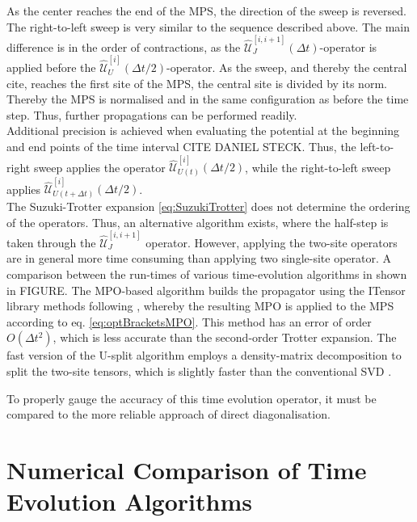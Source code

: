 As the center reaches the end of the MPS, the direction of the sweep is reversed. The right-to-left sweep is very similar to the sequence described above. The main difference is in the order of contractions, as the $\hat{\mathcal{U}}_{J}^{[i,i+1]} (\Delta t)$-operator is applied before the $\hat{\mathcal{U}}_{U}^{[i]} (\Delta t /2)$-operator. As the sweep, and thereby the central cite, reaches the first site of the MPS, the central site is divided by its norm. Thereby the MPS is normalised and in the same configuration as before the time step. Thus, further propagations can be performed readily.\\ 
Additional precision is achieved when evaluating the potential at the beginning and end points of the time interval CITE DANIEL STECK. Thus, the left-to-right sweep applies the operator $\hat{\mathcal{U}}_{U(t)}^{[i]} (\Delta t /2)$, while the right-to-left sweep applies $\hat{\mathcal{U}}_{U(t + \Delta t)}^{[i]} (\Delta t /2)$.\\

The Suzuki-Trotter expansion \eqref{eq:SuzukiTrotter} does not determine the ordering of the operators. Thus, an alternative algorithm exists, where the half-step is taken through the $\hat{\mathcal{U}}_{J}^{[i,i+1]}$ operator. However, applying the two-site operators are in general more time consuming than applying two single-site operator.
A comparison between the run-times of various time-evolution algorithms in shown in FIGURE. The MPO-based algorithm builds the propagator using the ITensor library methods following \cite{Pollmann2015}, whereby the resulting MPO is applied to the MPS according to eq. \eqref{eq:optBracketsMPO}. This method has an error of order $O(\Delta t ^2)$, which is less accurate than the second-order Trotter expansion.
The fast version of the U-split algorithm employs a density-matrix decomposition to split the two-site tensors, which is slightly faster than the conventional SVD \cite{schollwock}. 

 
 To properly gauge the accuracy of this time evolution operator, it must be compared to the more reliable approach of direct diagonalisation.


\section{Numerical Comparison of Time Evolution Algorithms}